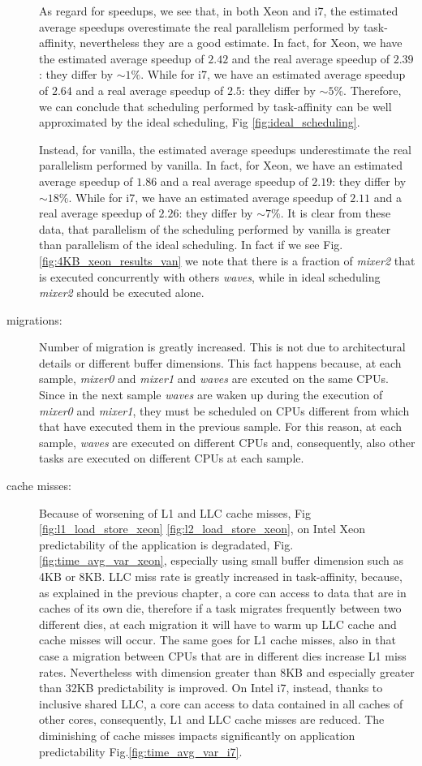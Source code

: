 \begin{description}
As regard for speedups, we see that, in both Xeon and i7, the estimated average speedups overestimate the real parallelism performed by task-affinity, 
nevertheless they are a good estimate. In fact, for Xeon, we have the estimated average speedup of $2.42$ and the real average speedup of $2.39$: they 
differ by $\sim 1\%$.  While for i7, we have an estimated average speedup of $2.64$ and a real average speedup of $2.5$: they differ by $\sim 5\%$. 
Therefore, we can conclude that scheduling performed by task-affinity can be well approximated by the ideal scheduling, Fig \ref{fig:ideal_scheduling}.

Instead, for vanilla, the estimated average speedups underestimate the real parallelism performed by vanilla. 
In fact, for Xeon, we have an estimated average speedup of $1.86$ and a real average speedup of $2.19$: they differ by $\sim 18\%$. While for i7, we have 
an estimated average speedup of $2.11$ and a real average speedup of $2.26$: they differ by $\sim 7\%$. It is clear from these data, that parallelism
of the scheduling performed by vanilla is greater than parallelism of the ideal scheduling. In fact if we see Fig. \ref{fig:4KB_xeon_results_van} we note 
that there is a fraction of \textit{mixer2} that is executed concurrently with others \textit{waves}, while in ideal scheduling \textit{mixer2} should be 
executed alone.

\item[migrations:] Number of migration is greatly increased. This is not due to architectural details or different buffer dimensions. This fact happens 
because, at each sample, \textit{mixer0} and \textit{mixer1} and \textit{waves} are excuted on the same CPUs. Since in the next sample \textit{waves} are 
waken up during the execution of \textit{mixer0} and \textit{mixer1}, they must be scheduled on CPUs different from which that have executed them in 
the previous sample. For this reason, at each sample, \textit{waves} are executed on different CPUs and, consequently, also other tasks are executed on 
different CPUs at each sample.

\item[cache misses:] Because of worsening of L1 and LLC cache misses, Fig \ref{fig:l1_load_store_xeon} \ref{fig:l2_load_store_xeon}, on Intel Xeon 
predictability of the application is degradated, Fig. \ref{fig:time_avg_var_xeon}, especially using small buffer dimension such as 4KB or 8KB. LLC miss rate 
is greatly increased in task-affinity, because, as explained in the previous chapter, a core can access to data that are in caches of its own die, 
therefore if a task migrates frequently between two different dies, at each migration it will have to warm up LLC cache and cache misses will occur. The 
same goes for L1 cache misses, also in that case a migration between CPUs that are in different dies increase L1 miss rates. Nevertheless with dimension 
greater than 8KB and especially greater than 32KB predictability is improved. On Intel i7, instead, thanks to inclusive shared LLC, a core can access to 
data contained in all caches of other cores, consequently, L1 and LLC cache misses are reduced. The diminishing of cache misses impacts significantly on 
application predictability Fig.\ref{fig:time_avg_var_i7}.


\end{description}
